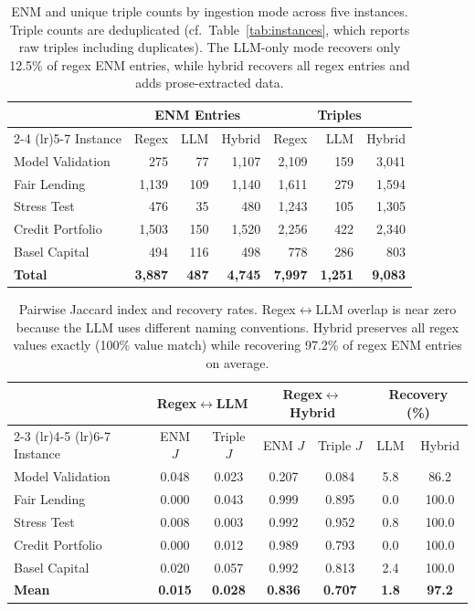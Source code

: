 \documentclass[11pt]{article}
\begin{document}
\begin{table}[t]
\centering
\caption{ENM and unique triple counts by ingestion mode across five
instances.  Triple counts are deduplicated (cf.\ Table~\ref{tab:instances},
which reports raw triples including duplicates).  The LLM-only mode
recovers only 12.5\% of regex ENM entries, while hybrid recovers all
regex entries and adds prose-extracted data.}
\label{tab:ingestion_counts}
\small
\begin{tabular}{lrrrrrr}
\toprule
& \multicolumn{3}{c}{ENM Entries} & \multicolumn{3}{c}{Triples} \\
\cmidrule(lr){2-4} \cmidrule(lr){5-7}
Instance & Regex & LLM & Hybrid & Regex & LLM & Hybrid \\
\midrule
Model Validation   & 275   & 77  & 1{,}107 & 2{,}109 & 159   & 3{,}041 \\
Fair Lending       & 1{,}139 & 109 & 1{,}140 & 1{,}611 & 279 & 1{,}594 \\
Stress Test        & 476   & 35  & 480     & 1{,}243 & 105   & 1{,}305 \\
Credit Portfolio   & 1{,}503 & 150 & 1{,}520 & 2{,}256 & 422 & 2{,}340 \\
Basel Capital      & 494   & 116 & 498     & 778     & 286   & 803 \\
\midrule
\textbf{Total}     & \textbf{3{,}887} & \textbf{487} & \textbf{4{,}745}
                   & \textbf{7{,}997} & \textbf{1{,}251} & \textbf{9{,}083} \\
\bottomrule
\end{tabular}
\end{table}

\begin{table}[t]
\centering
\caption{Pairwise Jaccard index and recovery rates.  Regex$\leftrightarrow$LLM
overlap is near zero because the LLM uses different naming conventions.
Hybrid preserves all regex values exactly (100\% value match) while
recovering 97.2\% of regex ENM entries on average.}
\label{tab:ingestion_jaccard}
\small
\begin{tabular}{lcccccc}
\toprule
& \multicolumn{2}{c}{Regex$\leftrightarrow$LLM} & \multicolumn{2}{c}{Regex$\leftrightarrow$Hybrid} & \multicolumn{2}{c}{Recovery (\%)} \\
\cmidrule(lr){2-3} \cmidrule(lr){4-5} \cmidrule(lr){6-7}
Instance & ENM $J$ & Triple $J$ & ENM $J$ & Triple $J$ & LLM & Hybrid \\
\midrule
Model Validation   & 0.048 & 0.023 & 0.207 & 0.084 &  5.8 &  86.2 \\
Fair Lending       & 0.000 & 0.043 & 0.999 & 0.895 &  0.0 & 100.0 \\
Stress Test        & 0.008 & 0.003 & 0.992 & 0.952 &  0.8 & 100.0 \\
Credit Portfolio   & 0.000 & 0.012 & 0.989 & 0.793 &  0.0 & 100.0 \\
Basel Capital      & 0.020 & 0.057 & 0.992 & 0.813 &  2.4 & 100.0 \\
\midrule
\textbf{Mean}      & \textbf{0.015} & \textbf{0.028} & \textbf{0.836} & \textbf{0.707} & \textbf{1.8} & \textbf{97.2} \\
\bottomrule
\end{tabular}
\end{table}
\end{document}
